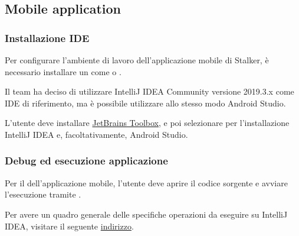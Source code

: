 \documentclass[../manuale-manutentore.tex]{subfiles}
\begin{document}
\subsection{Mobile application}%
\label{sub:mobile_application}


\subsubsection{Installazione IDE}%
\label{subs:installazione_ide}

Per configurare l'ambiente di lavoro dell'applicazione mobile di Stalker, è necessario installare un  come  o .

Il team ha deciso di utilizzare IntelliJ IDEA Community versione 2019.3.x come IDE di riferimento, ma è possibile utilizzare allo stesso modo Android Studio.

L'utente deve installare \href{https://www.jetbrains.com/toolbox-app/}{JetBrains Toolbox}, e poi selezionare per l'installazione IntelliJ IDEA e, facoltativamente, Android Studio.

\subsubsection{Debug ed esecuzione applicazione}%
\label{subs:debug_ed_esecuzione_applicazione}

Per il  dell'applicazione mobile, l'utente deve aprire il codice sorgente e avviare l'esecuzione tramite .


Per avere un quadro generale delle specifiche operazioni da eseguire su IntelliJ IDEA, visitare il seguente \href{https://www.jetbrains.com/help/idea/running-and-debugging-android-applications.html}{indirizzo}.
\end{document}
